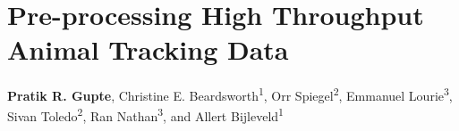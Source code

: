 \chapter{Pre-processing High Throughput Animal Tracking Data}\label{ch:preprocessing}
% 
{\noindent \sffamily\textbf{Pratik R. Gupte}, Christine E. Beardsworth\textsuperscript{1}, Orr Spiegel\textsuperscript{2}, Emmanuel Lourie\textsuperscript{3}, Sivan Toledo\textsuperscript{2}, Ran Nathan\textsuperscript{3}, and Allert Bijleveld\textsuperscript{1}}


